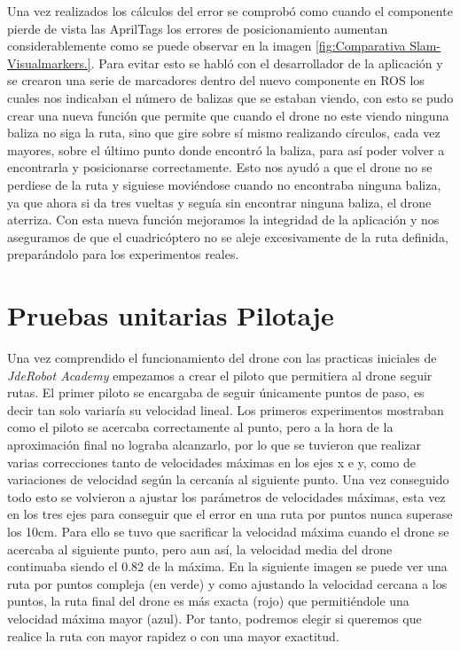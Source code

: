 \hspace{1cm} Una vez realizados los cálculos del error se comprobó como cuando el componente pierde de vista las AprilTags los errores de posicionamiento aumentan considerablemente como se puede observar en la imagen \ref{fig:Comparativa Slam-Visualmarkers.}. Para evitar esto se habló con el desarrollador de la aplicación y se crearon una serie de  marcadores dentro del nuevo componente en ROS los cuales nos indicaban el número de balizas que se estaban viendo, con esto se pudo crear una nueva función que permite que cuando el drone no este viendo ninguna baliza no siga la ruta, sino que gire sobre sí mismo realizando círculos, cada vez mayores, sobre el último punto donde encontró la baliza, para así poder volver a encontrarla y posicionarse correctamente. Esto nos ayudó a que el drone no se perdiese de la ruta y siguiese moviéndose cuando no encontraba ninguna baliza, ya que ahora si da tres vueltas y seguía sin encontrar ninguna baliza, el drone aterriza. Con esta nueva función mejoramos la integridad de la aplicación y nos aseguramos de que el cuadricóptero no se aleje excesivamente de la ruta definida, preparándolo para los experimentos reales.

\section{Pruebas unitarias Pilotaje}
\hspace{1cm} Una vez comprendido el funcionamiento del drone con las practicas iniciales de \textit{JdeRobot Academy} empezamos a crear el piloto que permitiera al drone seguir rutas. El primer piloto se encargaba de seguir únicamente puntos de paso, es decir tan solo variaría su velocidad lineal. Los primeros experimentos mostraban como el piloto se acercaba correctamente al punto, pero a la hora de la aproximación final no lograba alcanzarlo, por lo que se tuvieron que realizar varias correcciones tanto de velocidades máximas en los ejes x e y, como de variaciones de velocidad según la cercanía al siguiente punto. Una vez conseguido todo esto se volvieron a ajustar los parámetros de velocidades máximas, esta vez en los tres ejes para conseguir que el error en una ruta por puntos nunca superase los 10cm. Para ello se tuvo que sacrificar la velocidad máxima cuando el drone se acercaba al siguiente punto, pero aun así, la velocidad media del drone continuaba siendo el 0.82 de la máxima. En la siguiente imagen se puede ver una ruta por puntos compleja (en verde) y como ajustando la velocidad cercana a los puntos, la ruta final del drone es más exacta (rojo) que permitiéndole una velocidad máxima mayor (azul). Por tanto, podremos elegir si queremos que realice la ruta con mayor rapidez o con una mayor exactitud.

